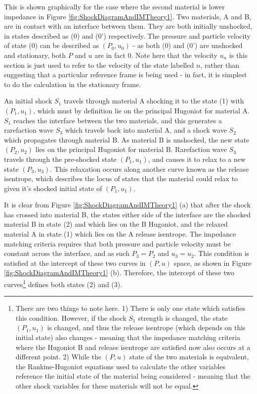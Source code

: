 This is shown graphically for the case where the second material is lower impedance in Figure \ref{fig:ShockDiagramAndIMTheory1}. Two materials, A and B, are in contact with an interface between them. They are both initially unshocked, in states described as (0) and (0') respectively. The pressure and particle velocity of state (0) can be described as $(P_0, u_0)$ - as both (0) and (0') are unshocked and stationary, both $P$ and $u$ are in fact 0. Note here that the velocity $u_n$ is this section is just used to refer to the velocity of the state labelled $n$, rather than suggesting that a particular reference frame is being used - in fact, it is simplest to do the calculation in the stationary frame.

An initial shock $S_1$ travels through material A shocking it to the state (1) with $(P_1, u_1)$, which must by definition lie on the principal Hugoniot for material A. $S_1$ reaches the interface between the two materials, and this generates a rarefaction wave $S_3$ which travels back into material A, and a shock wave $S_2$ which propagates through material B. As material B is unshocked, the new state $(P_2, u_2)$ lies on the principal Hugoniot for material B. Rarefaction wave $S_3$ travels through the pre-shocked state $(P_1, u_1)$, and causes it to relax to a new state $(P_3, u_3)$. This relaxation occurs along another curve known as the release isentrope, which describes the locus of states that the material could relax to given it's shocked initial state of $(P_1, u_1)$. 

It is clear from Figure \ref{fig:ShockDiagramAndIMTheory1} (a) that after the shock has crossed into material B, the states either side of the interface are the shocked material B in state (2) and which lies on the B Hugoniot, and the relaxed material A in state (1) which lies on the A release isentrope. The impedance matching criteria requires that both pressure and particle velocity must be constant across the interface, and as such $P_3 = P_2$ and $u_3 = u_2$. This condition is satisfied at the intercept of these two curves in $(P, u)$ space, as shown in Figure \ref{fig:ShockDiagramAndIMTheory1} (b). Therefore, the intercept of these two curves\footnote{There are two things to note here. 1) There is only one state which satisfies this condition. However, if the shock $S_1$ strength is changed, the state $(P_1, u_1)$ is changed, and thus the release isentrope (which depends on this initial state) also changes - meaning that the impedance matching criteria where the Hugoniot B and release isentrope are satisfied now also occurs at a different point. 2) While the $(P,u)$ state of the two materials is equivalent, the Rankine-Hugoniot equations used to calculate the other variables reference the initial state of the material being considered - meaning that the other shock variables for these materials will not be equal.} defines both states (2) and (3). 

